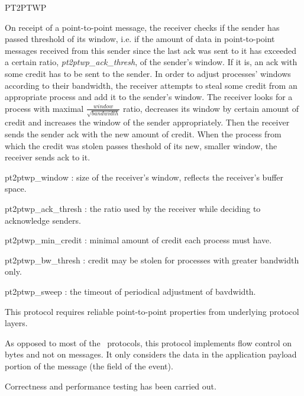 \begin{Layer}{PT2PTWP}
\begin{Protocol}
On receipt of a point-to-point message, the receiver checks if the sender 
has passed threshold of its window, i.e. if the amount of data in
point-to-point messages received from this sender since the last ack was
sent to it has exceeded a certain ratio, \emph{pt2ptwp\_ack\_thresh}, 
of the sender's window. If it is, an ack with some credit has to be sent 
to the sender. In order to adjust processes' windows according to their 
bandwidth, the receiver attempts to steal some credit from an appropriate 
process and add it to the sender's window. The receiver looks for a process 
with maximal \( \frac{window}{\sqrt{bandwidth}} \) ratio, decreases its window 
by certain amount of credit and increases the window of the sender appropriately. 
Then the receiver sends the sender ack with the new amount of credit. When the 
process from which the credit was stolen passes theshold of its new, smaller 
window, the receiver sends ack to it.
\end{Protocol}

\begin{Parameters}
\item pt2ptwp\_window : size of the receiver's window, reflects the receiver's 
buffer space.
\item pt2ptwp\_ack\_thresh : the ratio used by the receiver while deciding 
to acknowledge senders.
\item pt2ptwp\_min\_credit : minimal amount of credit each process must have.
\item pt2ptwp\_bw\_thresh : credit may be stolen for processes with greater 
bandwidth only.
\item pt2ptwp\_sweep : the timeout of periodical adjustment of bavdwidth.
\end{Parameters}

\begin{Properties}
\item
This protocol requires reliable point-to-point properties from underlying 
protocol layers.
\end{Properties}

\begin{Notes}
\item
As opposed to most of the \ensemble\ protocols, this protocol implements flow
control on bytes and not on messages. It only considers the data in the
application payload portion of the message (the  field of the
event).
\end{Notes}

\begin{Sources}
\end{Sources}

\begin{Testing}
\item
Correctness and performance testing has been carried out.
\end{Testing}

\end{Layer}
